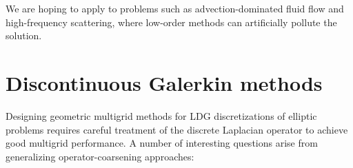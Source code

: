 We are hoping to apply \ultraSEM to problems such as advection-dominated fluid flow and high-frequency scattering, where low-order methods can artificially pollute the solution.


\section*{Discontinuous Galerkin methods}

Designing geometric multigrid methods for LDG discretizations of elliptic problems requires careful treatment of the discrete Laplacian operator to achieve good multigrid performance. A number of interesting questions arise from generalizing operator-coarsening approaches:

